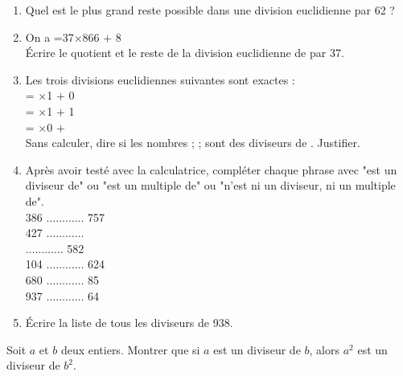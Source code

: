 {\begin{Exercice}
\begin{enumerate}[itemsep=2em]
	\item \begin{minipage}[t]{\linewidth}Quel est le plus grand reste possible dans une division euclidienne par 62 ?\end{minipage}
	\item \begin{minipage}[t]{\linewidth}On a =37$\times$866 $+$ 8\\Écrire le quotient et le reste de la division euclidienne de  par 37.\end{minipage}
	\item \begin{minipage}[t]{\linewidth}Les trois divisions euclidiennes suivantes sont exactes : \\ = $\times$1 $+$ 0\\ = $\times$1 $+$ 1\\ = $\times$0 $+$ \\Sans calculer, dire si les nombres ; ;  sont des diviseurs de . Justifier.\end{minipage}
	\item \begin{minipage}[t]{\linewidth}Après avoir testé avec la calculatrice, compléter chaque phrase avec "est un diviseur de" ou "est un multiple de" ou "n'est ni un diviseur, ni un multiple de".\\386 $\ldots\ldots\ldots\ldots$ 757\\427 $\ldots\ldots\ldots\ldots$ \\ $\ldots\ldots\ldots\ldots$ 582\\104 $\ldots\ldots\ldots\ldots$ 624\\680 $\ldots\ldots\ldots\ldots$ 85\\937 $\ldots\ldots\ldots\ldots$ 64\end{minipage}
	\item \begin{minipage}[t]{\linewidth}Écrire la liste de tous les diviseurs de 938.\end{minipage}
\end{enumerate}
\end{Exercice}

\begin{Exercice}
Soit $ a $ et $ b $ deux entiers. Montrer que si $ a $ est un diviseur de $ b $, alors $ a^2 $ est un diviseur de $ b^2 $.
\end{Exercice}

}
